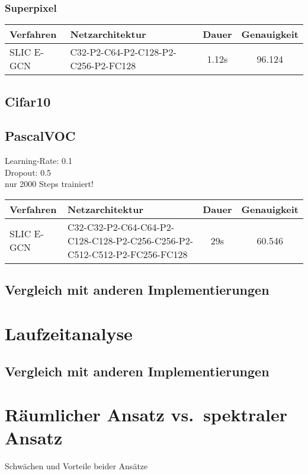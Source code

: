 \subsubsection{Superpixel}

\begin{tabular}{p{2.5cm}p{7.5cm}cc}
  \hline
  Verfahren & Netzarchitektur & Dauer & Genauigkeit\\
  \hline
  SLIC E-GCN & C32-P2-C64-P2-C128-P2-C256-P2-FC128 & 1.12s & 96.124\\
  \hline
\end{tabular}

\subsection{Cifar10}
\subsection{PascalVOC}

Learning-Rate: 0.1\\
Dropout: 0.5\\
nur 2000 Steps trainiert!\\

\begin{tabular}{p{2.5cm}p{7.5cm}cc}
  \hline
  Verfahren & Netzarchitektur & Dauer & Genauigkeit\\
  \hline
  SLIC E-GCN & C32-C32-P2-C64-C64-P2-C128-C128-P2-C256-C256-P2-C512-C512-P2-FC256-FC128 & 29s & 60.546\\
  \hline
\end{tabular}

\newpage

  \subsection{Vergleich mit anderen Implementierungen}
\section{Laufzeitanalyse}
  \subsection{Vergleich mit anderen Implementierungen}
\section{Räumlicher Ansatz vs.\ spektraler Ansatz}
Schwächen und Vorteile beider Ansätze

